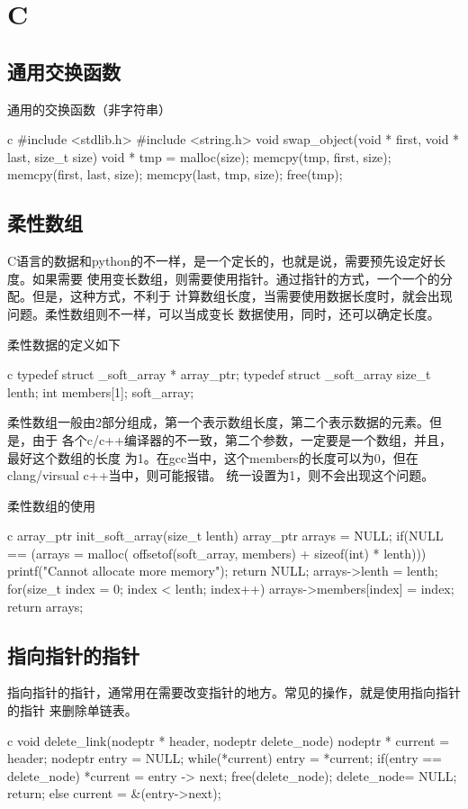\chapter{C}

\section{通用交换函数}
通用的交换函数（非字符串）
\begin{code-block}{c}
#include <stdlib.h>
#include <string.h>
void swap_object(void * first, void * last, size_t size)
{
    void * tmp = malloc(size);
    memcpy(tmp, first, size);
    memcpy(first, last, size);
    memcpy(last, tmp, size);
    free(tmp);
}
\end{code-block}

\section{柔性数组}
C语言的数据和python的不一样，是一个定长的，也就是说，需要预先设定好长度。如果需要
使用变长数组，则需要使用指针。通过指针的方式，一个一个的分配。但是，这种方式，不利于
计算数组长度，当需要使用数据长度时，就会出现问题。柔性数组则不一样，可以当成变长
数据使用，同时，还可以确定长度。

柔性数据的定义如下
\begin{code-block}{c}
typedef struct _soft_array * array_ptr;
typedef struct _soft_array{
    size_t lenth;
    int members[1];
}soft_array;
\end{code-block}

柔性数组一般由2部分组成，第一个表示数组长度，第二个表示数据的元素。但是，由于
各个c/c++编译器的不一致，第二个参数，一定要是一个数组，并且，最好这个数组的长度
为1。在gcc当中，这个members的长度可以为0，但在clang/virsual c++当中，则可能报错。
统一设置为1，则不会出现这个问题。

柔性数组的使用
\begin{code-block}{c}
array_ptr init_soft_array(size_t lenth){
    array_ptr arrays = NULL;
    if(NULL == (arrays = malloc(
        offsetof(soft_array, members) + sizeof(int) * lenth))){
        printf("Cannot allocate more memory\n");
        return NULL;
    }
    arrays->lenth = lenth;
    for(size_t index = 0; index < lenth; index++){
        arrays->members[index] = index;
    }
    return arrays;
}
\end{code-block}

\section{指向指针的指针}
指向指针的指针，通常用在需要改变指针的地方。常见的操作，就是使用指向指针的指针
来删除单链表。
\begin{code-block}{c}
void delete_link(nodeptr * header, nodeptr delete_node) {
    nodeptr * current = header;
    nodeptr entry = NULL;
    while(*current) {
        entry = *current;
        if(entry == delete_node) {
            *current = entry -> next;
            free(delete_node);
            delete_node= NULL;
            return;
        } else {
            current = &(entry->next);
        }
    }
}
\end{code-block}

